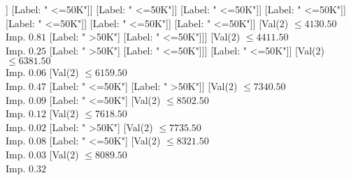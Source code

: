 \documentclass[margin=10pt]{standalone}
\begin{document}
\begin{forest}
																				[Val($2$) $ \leq 3721.50$ \\ Imp. $0.02$
																					[Val($2$) $ \leq 3604.50$ \\ Imp. $0.01$
																						[Val($2$) $ \leq 1458.50$ \\ Imp. $0.01$
																							[Val($2$) $ \leq 1429.50$ \\ Imp. $0.04$
																								[Val($2$) $ \leq 1191.50$ \\ Imp. $0.04$
																									[Val($2$) $ \leq 1141.50$ \\ Imp. $0.06$
																										[Val($2$) $ \leq 1016.50$ \\ Imp. $0.05$
																											[Val($2$) $ \leq 958.50$ \\ Imp. $0.09$
																												[Label: " <=50K"]
																												[Label: " >50K"]]
																											[Label: " <=50K"]]
																										[Label: " <=50K"]]
																									[Label: " <=50K"]]
																								[Label: " <=50K"]]
																							[Label: " <=50K"]]
																						[Label: " <=50K"]]
																					[Label: " <=50K"]]
																				[Val($2$) $ \leq 4130.50$ \\ Imp. $0.81$
																					[Label: " >50K"]
																					[Label: " <=50K"]]]
																			[Val($2$) $ \leq 4411.50$ \\ Imp. $0.25$
																				[Label: " >50K"]
																				[Label: " <=50K"]]]
																		[Label: " <=50K"]]
																	[Val($2$) $ \leq 6381.50$ \\ Imp. $0.06$
																		[Val($2$) $ \leq 6159.50$ \\ Imp. $0.47$
																			[Label: " <=50K"]
																			[Label: " >50K"]]
																		[Val($2$) $ \leq 7340.50$ \\ Imp. $0.09$
																			[Label: " <=50K"]
																			[Val($2$) $ \leq 8502.50$ \\ Imp. $0.12$
																				[Val($2$) $ \leq 7618.50$ \\ Imp. $0.02$
																					[Label: " >50K"]
																					[Val($2$) $ \leq 7735.50$ \\ Imp. $0.08$
																						[Label: " <=50K"]
																						[Val($2$) $ \leq 8321.50$ \\ Imp. $0.03$
																							[Val($2$) $ \leq 8089.50$ \\ Imp. $0.32$

\end{forest}
\end{document}
